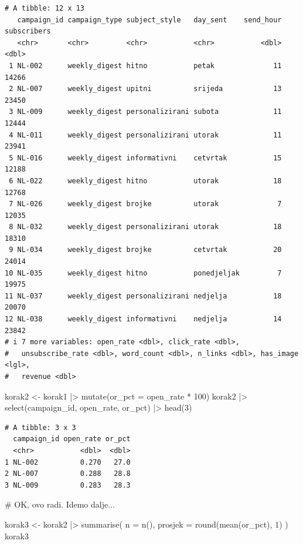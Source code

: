 \documentclass[
  croatian,
  letterpaper,
  DIV=11,
  numbers=noendperiod]{scrartcl}
\newenvironment{Shaded}{\begin{snugshade}}{\end{snugshade}}
\newcommand{\AttributeTok}[1]{\textcolor[rgb]{0.40,0.45,0.13}{#1}}
\newcommand{\CommentTok}[1]{\textcolor[rgb]{0.37,0.37,0.37}{#1}}
\newcommand{\DecValTok}[1]{\textcolor[rgb]{0.68,0.00,0.00}{#1}}
\newcommand{\FunctionTok}[1]{\textcolor[rgb]{0.28,0.35,0.67}{#1}}
\newcommand{\NormalTok}[1]{\textcolor[rgb]{0.00,0.23,0.31}{#1}}
\newcommand{\OtherTok}[1]{\textcolor[rgb]{0.00,0.23,0.31}{#1}}
\newcommand{\SpecialCharTok}[1]{\textcolor[rgb]{0.37,0.37,0.37}{#1}}
\begin{document}
\begin{verbatim}
# A tibble: 12 x 13
   campaign_id campaign_type subject_style   day_sent    send_hour subscribers
   <chr>       <chr>         <chr>           <chr>           <dbl>       <dbl>
 1 NL-002      weekly_digest hitno           petak              11       14266
 2 NL-007      weekly_digest upitni          srijeda            13       23450
 3 NL-009      weekly_digest personalizirani subota             11       12444
 4 NL-011      weekly_digest personalizirani utorak             11       23941
 5 NL-016      weekly_digest informativni    cetvrtak           15       12188
 6 NL-022      weekly_digest hitno           utorak             18       12768
 7 NL-026      weekly_digest brojke          utorak              7       12035
 8 NL-032      weekly_digest personalizirani utorak             18       18310
 9 NL-034      weekly_digest brojke          cetvrtak           20       24014
10 NL-035      weekly_digest hitno           ponedjeljak         7       19975
11 NL-037      weekly_digest personalizirani nedjelja           18       20070
12 NL-038      weekly_digest informativni    nedjelja           14       23842
# i 7 more variables: open_rate <dbl>, click_rate <dbl>,
#   unsubscribe_rate <dbl>, word_count <dbl>, n_links <dbl>, has_image <lgl>,
#   revenue <dbl>
\end{verbatim}

\begin{Shaded}
\begin{Highlighting}[]
\NormalTok{korak2 }\OtherTok{\textless{}{-}}\NormalTok{ korak1 }\SpecialCharTok{|\textgreater{}} \FunctionTok{mutate}\NormalTok{(}\AttributeTok{or\_pct =}\NormalTok{ open\_rate }\SpecialCharTok{*} \DecValTok{100}\NormalTok{)}
\NormalTok{korak2 }\SpecialCharTok{|\textgreater{}} \FunctionTok{select}\NormalTok{(campaign\_id, open\_rate, or\_pct) }\SpecialCharTok{|\textgreater{}} \FunctionTok{head}\NormalTok{(}\DecValTok{3}\NormalTok{)}
\end{Highlighting}
\end{Shaded}

\begin{verbatim}
# A tibble: 3 x 3
  campaign_id open_rate or_pct
  <chr>           <dbl>  <dbl>
1 NL-002          0.270   27.0
2 NL-007          0.288   28.8
3 NL-009          0.283   28.3
\end{verbatim}

\begin{Shaded}
\begin{Highlighting}[]
\CommentTok{\# OK, ovo radi. Idemo dalje...}

\NormalTok{korak3 }\OtherTok{\textless{}{-}}\NormalTok{ korak2 }\SpecialCharTok{|\textgreater{}}
  \FunctionTok{summarise}\NormalTok{(}
    \AttributeTok{n =} \FunctionTok{n}\NormalTok{(),}
    \AttributeTok{prosjek =} \FunctionTok{round}\NormalTok{(}\FunctionTok{mean}\NormalTok{(or\_pct), }\DecValTok{1}\NormalTok{)}
\NormalTok{  )}
\NormalTok{korak3}
\end{Highlighting}
\end{Shaded}
\end{document}
